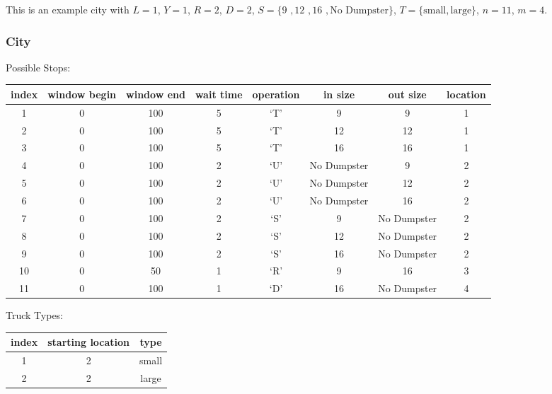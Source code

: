 \documentclass{article}
\begin{document}
This is an example city with $L = 1$, $Y = 1$, $R = 2$, $D = 2$, $S = \{ \mbox{9  }, \mbox{12   }, \mbox{16   }, \mbox{No Dumpster} \}$,
$T = \{ \mbox {small}, \mbox{large}  \}$, $n=11$, $m=4$.

\subsubsection{City}
Possible Stops:

\begin{tabular} {c | c c c c c c c }
 index  & window begin & window end & wait time & operation & in size      & out size       & location  \\
\hline
   1    &    0         & 100        & 5         & `T'       & 9            & 9              &    1      \\
   2    &    0         & 100        & 5         & `T'       & 12           & 12             &    1      \\
   3    &    0         & 100        & 5         & `T'       & 16           & 16             &    1      \\
   4    &    0         & 100        & 2         & `U'       & No Dumpster  & 9              &    2      \\
   5    &    0         & 100        & 2         & `U'       & No Dumpster  & 12             &    2      \\
   6    &    0         & 100        & 2         & `U'       & No Dumpster  & 16             &    2      \\
   7    &    0         & 100        & 2         & `S'       & 9            & No Dumpster    &    2      \\
   8    &    0         & 100        & 2         & `S'       & 12           & No Dumpster    &    2      \\
   9    &    0         & 100        & 2         & `S'       & 16           & No Dumpster    &    2      \\
  10    &    0         & 50         & 1         & `R'       & 9            &        16      &    3      \\
  11    &    0         & 100        & 1         & `D'       & 16           & No Dumpster    &    4      \\
\end{tabular}


Truck Types:

\begin{tabular} {c | c c}
index & starting location   & type  \\
\hline
  1   &  2                  & small \\
  2   &  2                  & large \\
\end{tabular}
\end{document}

